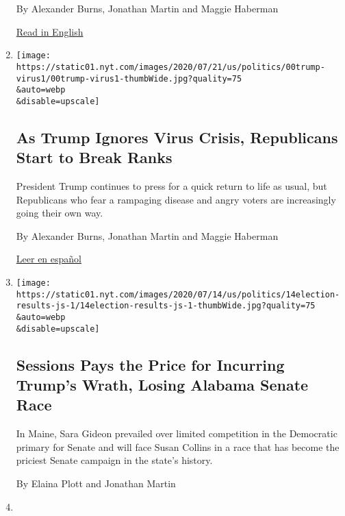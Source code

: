 \begin{enumerate}
  By Alexander Burns, Jonathan Martin and Maggie Haberman

  \href{https://www.nytimes.com/2020/07/19/us/politics/republicans-contradict-trump-coronavirus.html}{Read
  in English}
\item
  \href{/2020/07/19/us/politics/republicans-contradict-trump-coronavirus.html}{}

  \texttt{[image: https://static01.nyt.com/images/2020/07/21/us/politics/00trump-virus1/00trump-virus1-thumbWide.jpg?quality=75\\\&auto=webp\\\&disable=upscale]}

  \hypertarget{as-trump-ignores-virus-crisis-republicans-start-to-break-ranks}{%
  \subsection{As Trump Ignores Virus Crisis, Republicans Start to Break
  Ranks}\label{as-trump-ignores-virus-crisis-republicans-start-to-break-ranks}}

  President Trump continues to press for a quick return to life as
  usual, but Republicans who fear a rampaging disease and angry voters
  are increasingly going their own way.

  By Alexander Burns, Jonathan Martin and Maggie Haberman

  \href{https://www.nytimes.com/es/2020/07/21/espanol/estados-unidos/donald-trump-coronavirus-republicanos.html}{Leer
  en español}
\item
  \href{/2020/07/14/us/politics/Election-primary-runoff-results.html}{}

  \texttt{[image: https://static01.nyt.com/images/2020/07/14/us/politics/14election-results-js-1/14election-results-js-1-thumbWide.jpg?quality=75\\\&auto=webp\\\&disable=upscale]}

  \hypertarget{sessions-pays-the-price-for-incurring-trumps-wrath-losing-alabama-senate-race}{%
  \subsection{Sessions Pays the Price for Incurring Trump's Wrath,
  Losing Alabama Senate
  Race}\label{sessions-pays-the-price-for-incurring-trumps-wrath-losing-alabama-senate-race}}

  In Maine, Sara Gideon prevailed over limited competition in the
  Democratic primary for Senate and will face Susan Collins in a race
  that has become the priciest Senate campaign in the state's history.

  By Elaina Plott and Jonathan Martin
\item
  \href{/2020/07/11/us/politics/trump-biden-2020-election.html}{}


\end{enumerate}
